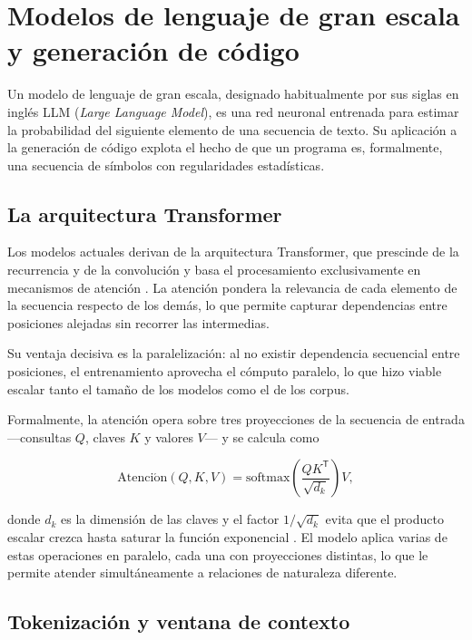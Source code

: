 \section{Modelos de lenguaje de gran escala y generación de código}

Un modelo de lenguaje de gran escala, designado habitualmente por sus siglas en
inglés LLM (\emph{Large Language Model}), es una red neuronal entrenada para
estimar la probabilidad del siguiente elemento de una secuencia de texto. Su
aplicación a la generación de código explota el hecho de que un programa es,
formalmente, una secuencia de símbolos con regularidades estadísticas.

\subsection{La arquitectura Transformer}

Los modelos actuales derivan de la arquitectura Transformer, que prescinde de la
recurrencia y de la convolución y basa el procesamiento exclusivamente en
mecanismos de atención \cite{vaswani2017attention}. La atención pondera la
relevancia de cada elemento de la secuencia respecto de los demás, lo que
permite capturar dependencias entre posiciones alejadas sin recorrer las
intermedias.

Su ventaja decisiva es la paralelización: al no existir dependencia secuencial
entre posiciones, el entrenamiento aprovecha el cómputo paralelo, lo que hizo
viable escalar tanto el tamaño de los modelos como el de los corpus.

Formalmente, la atención opera sobre tres proyecciones de la secuencia de
entrada —consultas $Q$, claves $K$ y valores $V$— y se calcula como

\begin{equation}
  \mathrm{Atenci\acute{o}n}(Q,K,V) = \mathrm{softmax}\!\left(
    \frac{QK^{\mathsf{T}}}{\sqrt{d_k}} \right) V ,
  \label{eq:atencion}
\end{equation}

donde $d_k$ es la dimensión de las claves y el factor $1/\sqrt{d_k}$ evita que el
producto escalar crezca hasta saturar la función exponencial
\cite{vaswani2017attention}. El modelo aplica varias de estas operaciones en
paralelo, cada una con proyecciones distintas, lo que le permite atender
simultáneamente a relaciones de naturaleza diferente.

\subsection{Tokenización y ventana de contexto}

